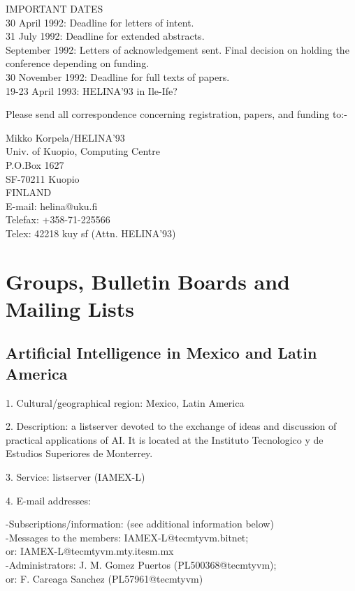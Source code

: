 IMPORTANT DATES\\
30 April 1992:      Deadline for letters of intent.\\
31 July 1992:       Deadline for extended abstracts.\\
September 1992:     Letters of acknowledgement sent. Final decision on
                    holding the conference depending on funding.\\
30 November 1992:   Deadline for full texts of papers.\\
19-23 April 1993:   HELINA'93 in Ile-Ife?

Please send all correspondence concerning registration, papers, and
funding to:-

Mikko Korpela/HELINA'93\\
Univ. of Kuopio, Computing Centre\\
P.O.Box 1627\\
SF-70211 Kuopio\\
FINLAND\\
E-mail:     helina@uku.fi\\
Telefax:    +358-71-225566\\
Telex:      42218 kuy sf (Attn. HELINA'93)

\section{Groups, Bulletin Boards and Mailing Lists}
\subsection{Artificial Intelligence in Mexico and Latin America}
1. Cultural/geographical region: Mexico, Latin America

2. Description: a listserver devoted to the exchange of ideas and discussion
of practical applications of AI. It is located at the Instituto Tecnologico
y de Estudios Superiores de Monterrey.

3. Service: listserver (IAMEX-L)

4. E-mail addresses:

-Subscriptions/information: (see additional information below)\\
-Messages to the members: IAMEX-L@tecmtyvm.bitnet;\\
                      or: IAMEX-L@tecmtyvm.mty.itesm.mx\\
-Administrators: J. M. Gomez Puertos (PL500368@tecmtyvm);\\
             or: F. Careaga Sanchez (PL57961@tecmtyvm)

